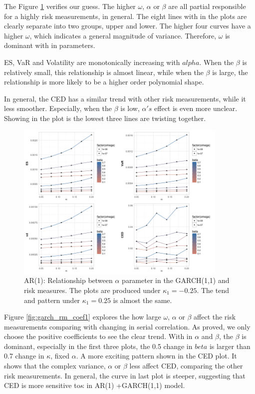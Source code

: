\documentclass[11pt]{article}
\begin{document}
The Figure \ref{fig:garch_rm_alpha1} verifies our guess. The higher $\omega$, $\alpha$ or $\beta$ are all partial responsible for a highly risk measurements, in general. The eight lines with in the plots are clearly separate into two groups, upper and lower. The higher four curves have a higher $\omega$, which indicates a general magnitude of variance. Therefore, $\omega$ is dominant with in parameters.

ES, VaR and Volatility are monotonically increasing with $alpha$. When the $\beta$ is relatively small, this relationship is almost linear, while when the $\beta$ is large, the relationship is more likely to be a higher order polynomial shape.

In general, the CED has a similar trend with other risk measurements, while it less smoother. Especially, when the $\beta$ is low, $\alpha's$ effect is even more unclear. Showing in the plot is the lowest three lines are twisting together. 
\begin{figure}[H]
\centering
\includegraphics[width = 0.9\textwidth]{../figures/simulation_garch/garch_AR1_risk_measures_neg_alpha.png}
\caption{AR(1): Relationship between $\alpha$ parameter in the GARCH(1,1) and risk measures. The plots are produced under $\kappa_1 = -0.25$. The tend and pattern under $\kappa_1 = 0.25$ is almost the same.}
\label{fig:garch_rm_alpha1}
\end{figure}

Figure \ref{fig:garch_rm_coef1} explores the how large $\omega$, $\alpha$ or $\beta$ affect the risk measurements comparing with changing in serial correlation. As proved, we only choose the positive coefficients to see the clear trend. With in $\alpha$ and $\beta$, the $\beta$ is dominant, especially in the first three plots, the 0.5 change in $beta$ is larger than 0.7 change in $\kappa$, fixed $\alpha$. A more exciting pattern shown in the CED plot. It shows that the complex variance, $\alpha$ or $\beta$ less affect CED, comparing the other risk measurements. In general, the curve in last plot is steeper, suggesting that CED is more sensitive to$\kappa$ in AR(1) +GARCH(1,1) model.
\end{document}
